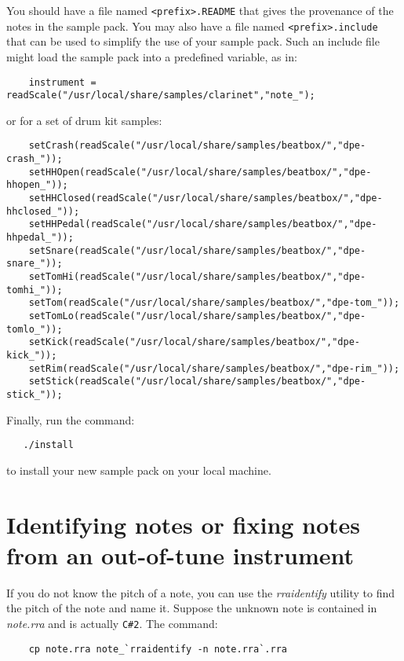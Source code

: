 \documentclass{article}
\begin{document}
You should have a file named \verb!<prefix>.README! that gives
the provenance of the notes in the sample pack. You may
also have a file named \verb!<prefix>.include!
that can be used to simplify the use of your sample pack. Such
an include file might load the sample pack into a predefined
variable, as in:

\begin{verbatim}
    instrument = readScale("/usr/local/share/samples/clarinet","note_");
\end{verbatim}

or for a set of drum kit samples:

\begin{verbatim}
    setCrash(readScale("/usr/local/share/samples/beatbox/","dpe-crash_"));
    setHHOpen(readScale("/usr/local/share/samples/beatbox/","dpe-hhopen_"));
    setHHClosed(readScale("/usr/local/share/samples/beatbox/","dpe-hhclosed_"));
    setHHPedal(readScale("/usr/local/share/samples/beatbox/","dpe-hhpedal_"));
    setSnare(readScale("/usr/local/share/samples/beatbox/","dpe-snare_"));
    setTomHi(readScale("/usr/local/share/samples/beatbox/","dpe-tomhi_"));
    setTom(readScale("/usr/local/share/samples/beatbox/","dpe-tom_"));
    setTomLo(readScale("/usr/local/share/samples/beatbox/","dpe-tomlo_"));
    setKick(readScale("/usr/local/share/samples/beatbox/","dpe-kick_"));
    setRim(readScale("/usr/local/share/samples/beatbox/","dpe-rim_"));
    setStick(readScale("/usr/local/share/samples/beatbox/","dpe-stick_"));
\end{verbatim}

Finally, run the command:

\begin{verbatim}
   ./install
\end{verbatim}

to install your new sample pack on your local machine.

\section*{Identifying notes or fixing notes from an out-of-tune instrument}

If you do not know the pitch of a note, you can use the {\it rraidentify}
utility to find the pitch of the note and name it. Suppose the unknown
note is contained in {\it note.rra} and is actually \verb!C#2!.
The command:

\begin{verbatim}
    cp note.rra note_`rraidentify -n note.rra`.rra
\end{verbatim}
\end{document}
